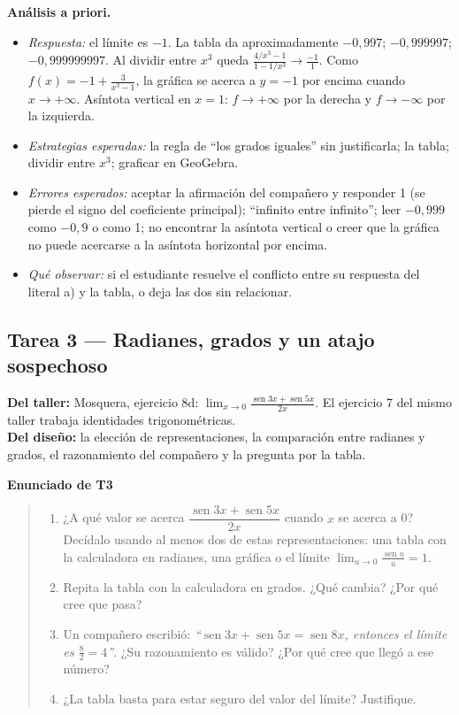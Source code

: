 \documentclass[11pt,letterpaper]{article}
\DeclareMathOperator{\seno}{sen}
\newenvironment{tarea}[1]{\par\medskip\noindent\textbf{Enunciado de #1}\begin{quote}}{\end{quote}}
\newenvironment{origen}{\par\small\noindent\ignorespaces}{\par\normalsize}
\begin{document}
\textbf{Análisis a priori.}
\begin{itemize}
  \item \emph{Respuesta:} el límite es $-1$. La tabla da aproximadamente $-0{,}997$; $-0{,}999997$; $-0{,}999999997$. Al dividir entre $x^3$ queda $\frac{4/x^3-1}{1-1/x^3}\to\frac{-1}{1}$. Como $f(x)=-1+\frac{3}{x^3-1}$, la gráfica se acerca a $y=-1$ por encima cuando $x\to+\infty$. Asíntota vertical en $x=1$: $f\to+\infty$ por la derecha y $f\to-\infty$ por la izquierda.
  \item \emph{Estrategias esperadas:} la regla de ``los grados iguales'' sin justificarla; la tabla; dividir entre $x^3$; graficar en GeoGebra.
  \item \emph{Errores esperados:} aceptar la afirmación del compañero y responder 1 (se pierde el signo del coeficiente principal); ``infinito entre infinito''; leer $-0{,}999$ como $-0{,}9$ o como 1; no encontrar la asíntota vertical o creer que la gráfica no puede acercarse a la asíntota horizontal por encima.
  \item \emph{Qué observar:} si el estudiante resuelve el conflicto entre su respuesta del literal a) y la tabla, o deja las dos sin relacionar.
\end{itemize}

\subsection*{Tarea 3 --- Radianes, grados y un atajo sospechoso}

\begin{origen}
\textbf{Del taller:} Mosquera, ejercicio 8d: $\lim_{x\to0}\frac{\seno 3x+\seno 5x}{2x}$. El ejercicio 7 del mismo taller trabaja identidades trigonométricas.\\
\textbf{Del diseño:} la elección de representaciones, la comparación entre radianes y grados, el razonamiento del compañero y la pregunta por la tabla.
\end{origen}

\begin{tarea}{T3}
\begin{enumerate}[label=\alph*)]
  \item ¿A qué valor se acerca $\dfrac{\seno 3x+\seno 5x}{2x}$ cuando $x$ se acerca a 0? Decídalo usando al menos dos de estas representaciones: una tabla con la calculadora en radianes, una gráfica o el límite $\lim_{u\to0}\frac{\seno u}{u}=1$.
  \item Repita la tabla con la calculadora en grados. ¿Qué cambia? ¿Por qué cree que pasa?
  \item Un compañero escribió: \emph{``$\seno 3x+\seno 5x=\seno 8x$, entonces el límite es $\frac{8}{2}=4$''}. ¿Su razonamiento es válido? ¿Por qué cree que llegó a ese número?
  \item ¿La tabla basta para estar seguro del valor del límite? Justifique.
\end{enumerate}
\end{tarea}
\end{document}
